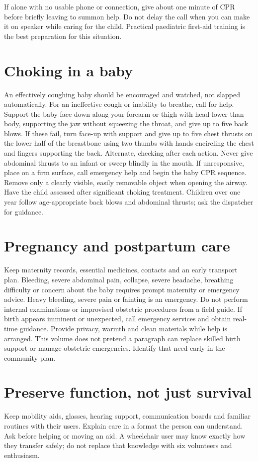 \documentclass[10pt,openright]{book}
\begin{document}
If alone with no usable phone or connection, give about one minute of CPR before briefly leaving to summon help. Do not delay the call when you can make it on speaker while caring for the child. Practical paediatric first-aid training is the best preparation for this situation.

\section*{Choking in a baby}
An effectively coughing baby should be encouraged and watched, not slapped automatically. For an ineffective cough or inability to breathe, call for help. Support the baby face-down along your forearm or thigh with head lower than body, supporting the jaw without squeezing the throat, and give up to five back blows. If these fail, turn face-up with support and give up to five chest thrusts on the lower half of the breastbone using two thumbs with hands encircling the chest and fingers supporting the back. Alternate, checking after each action. Never give abdominal thrusts to an infant or sweep blindly in the mouth. If unresponsive, place on a firm surface, call emergency help and begin the baby CPR sequence. Remove only a clearly visible, easily removable object when opening the airway. Have the child assessed after significant choking treatment. Children over one year follow age-appropriate back blows and abdominal thrusts; ask the dispatcher for guidance.

\section*{Pregnancy and postpartum care}
Keep maternity records, essential medicines, contacts and an early transport plan. Bleeding, severe abdominal pain, collapse, severe headache, breathing difficulty or concern about the baby requires prompt maternity or emergency advice. Heavy bleeding, severe pain or fainting is an emergency. Do not perform internal examinations or improvised obstetric procedures from a field guide. If birth appears imminent or unexpected, call emergency services and obtain real-time guidance. Provide privacy, warmth and clean materials while help is arranged. This volume does not pretend a paragraph can replace skilled birth support or manage obstetric emergencies. Identify that need early in the community plan.

\section*{Preserve function, not just survival}
Keep mobility aids, glasses, hearing support, communication boards and familiar routines with their users. Explain care in a format the person can understand. Ask before helping or moving an aid. A wheelchair user may know exactly how they transfer safely; do not replace that knowledge with six volunteers and enthusiasm.
\end{document}
